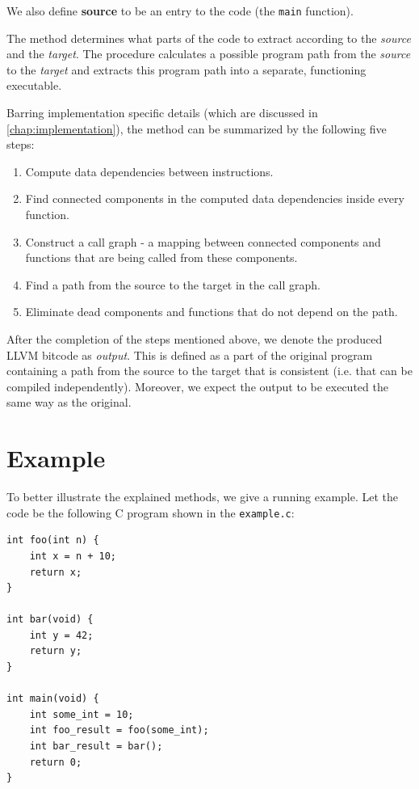 \documentclass[12pt, twoside]{fithesis2}
\renewcommand{\_}{\leavevmode \kern0.07em\vbox{\hrule width0.4em}}
\newenvironment{myEnumerate}{
  \begin{enumerate}[
    leftmargin=2em,
    rightmargin=1em,
    itemsep=\parskip,
    parsep=0em,
    topsep=0em,
    partopsep=0em
]
}{
  \end{enumerate}
}
\begin{document}
We also define \textbf{source} to be an entry to the code
(the \texttt{main} function).


The method determines what parts of the code to extract according to
the \emph{source} and the \emph{target}.
The procedure calculates a possible program path from the \emph{source} to the
\emph{target} and extracts this program path into a separate, functioning
executable.

Barring implementation specific details (which are discussed in
\autoref{chap:implementation}), the method can be summarized by the following
five steps:

\begin{myEnumerate}
\item Compute data dependencies between instructions.
\item Find connected components in the computed data dependencies inside
every function.
\item Construct a call graph - a mapping between connected components and functions
that are being called from these components.
\item Find a path from the source to the target in the call graph.
\item Eliminate dead components and functions that do not depend on the path.
\end{myEnumerate}

After the completion of the steps mentioned above, we denote the produced LLVM
bitcode as \emph{output}.
This is defined as a part of the original program containing a path from the
source to the target that is consistent (i.e. that can be compiled
independently).
Moreover, we expect the output to be executed the same way as the original.


\section{Example}
\label{sec:method_example}

To better illustrate the explained methods, we give a running example.
Let the code be the following C program shown in the
\texttt{example.c}:

\begin{verbatim}
int foo(int n) {
    int x = n + 10;
    return x;
}

int bar(void) {
    int y = 42;
    return y;
}

int main(void) {
    int some_int = 10;
    int foo_result = foo(some_int);
    int bar_result = bar();
    return 0;
}
\end{verbatim}
\end{document}
